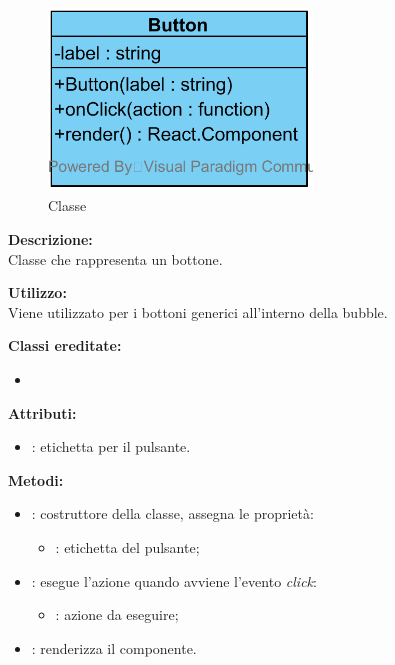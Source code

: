 \paragraph[::Button]{\class}\mbox{}\\ \label{\class}
\begin{figure}[H]
	\centering
	\includegraphics[width=7cm]{./diagrammi/framework/view/gui/button.png}
	\caption{Classe \class}
\end{figure}
\textbf{Descrizione:}\\
Classe che rappresenta un bottone.

\textbf{Utilizzo:}\\
Viene utilizzato per i bottoni generici all'interno della bubble.

\textbf{Classi ereditate:}
\begin{itemize}
	\item {}
\end{itemize}


\textbf{Attributi:}
\begin{itemize}
	\item {}: etichetta per il pulsante.
\end{itemize}

\textbf{Metodi:}
\begin{itemize}
	\item {}: costruttore della classe, assegna le proprietà:
	\begin{itemize}
		\item {}: etichetta del pulsante;
	\end{itemize}
	\item {}: esegue l'azione quando avviene l'evento \textit{click}:
	\begin{itemize}
		\item {}: azione da eseguire;
	\end{itemize}
	\item {}: renderizza il componente.
\end{itemize}

